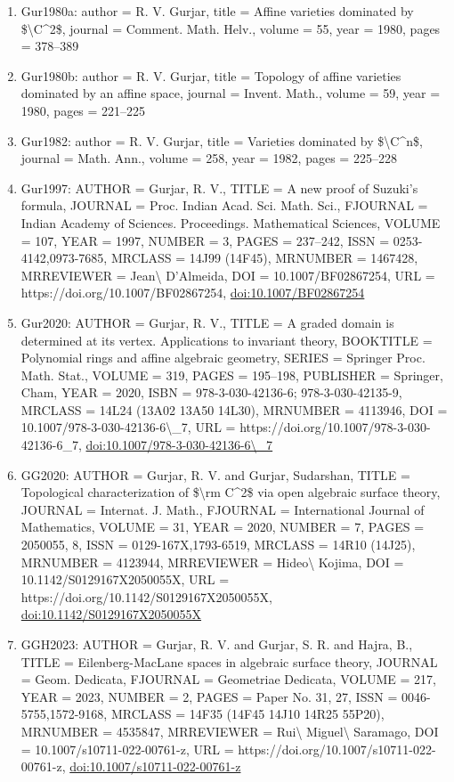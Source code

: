 \documentclass[11pt]{article}
\begin{document}
\begin{enumerate}[leftmargin=*]
  \item Gur1980a: author = R. V. Gurjar, title = Affine varieties dominated by \$\textbackslash{}C\^{}2\$, journal = Comment. Math. Helv., volume = 55, year = 1980, pages = 378--389
  \item Gur1980b: author = R. V. Gurjar, title = Topology of affine varieties dominated by an affine space, journal = Invent. Math., volume = 59, year = 1980, pages = 221--225
  \item Gur1982: author = R. V. Gurjar, title = Varieties dominated by \$\textbackslash{}C\^{}n\$, journal = Math. Ann., volume = 258, year = 1982, pages = 225--228
  \item Gur1997: AUTHOR = Gurjar, R. V., TITLE = A new proof of Suzuki's formula, JOURNAL = Proc. Indian Acad. Sci. Math. Sci., FJOURNAL = Indian Academy of Sciences. Proceedings. Mathematical Sciences, VOLUME = 107, YEAR = 1997, NUMBER = 3, PAGES = 237--242, ISSN = 0253-4142,0973-7685, MRCLASS = 14J99 (14F45), MRNUMBER = 1467428, MRREVIEWER = Jean\textbackslash{} D'Almeida, DOI = 10.1007/BF02867254, URL = https://doi.org/10.1007/BF02867254, \href{https://doi.org/10.1007/BF02867254}{doi:10.1007/BF02867254}
  \item Gur2020: AUTHOR = Gurjar, R. V., TITLE = A graded domain is determined at its vertex. Applications to invariant theory, BOOKTITLE = Polynomial rings and affine algebraic geometry, SERIES = Springer Proc. Math. Stat., VOLUME = 319, PAGES = 195--198, PUBLISHER = Springer, Cham, YEAR = 2020, ISBN = 978-3-030-42136-6; 978-3-030-42135-9, MRCLASS = 14L24 (13A02 13A50 14L30), MRNUMBER = 4113946, DOI = 10.1007/978-3-030-42136-6\textbackslash{}\_7, URL = https://doi.org/10.1007/978-3-030-42136-6\_7, \href{https://doi.org/10.1007/978-3-030-42136-6\textbackslash{}\_7}{doi:10.1007/978-3-030-42136-6\textbackslash{}\_7}
  \item GG2020: AUTHOR = Gurjar, R. V. and Gurjar, Sudarshan, TITLE = Topological characterization of \$\textbackslash{}rm C\^{}2\$ via open algebraic surface theory, JOURNAL = Internat. J. Math., FJOURNAL = International Journal of Mathematics, VOLUME = 31, YEAR = 2020, NUMBER = 7, PAGES = 2050055, 8, ISSN = 0129-167X,1793-6519, MRCLASS = 14R10 (14J25), MRNUMBER = 4123944, MRREVIEWER = Hideo\textbackslash{} Kojima, DOI = 10.1142/S0129167X2050055X, URL = https://doi.org/10.1142/S0129167X2050055X, \href{https://doi.org/10.1142/S0129167X2050055X}{doi:10.1142/S0129167X2050055X}
  \item GGH2023: AUTHOR = Gurjar, R. V. and Gurjar, S. R. and Hajra, B., TITLE = Eilenberg-MacLane spaces in algebraic surface theory, JOURNAL = Geom. Dedicata, FJOURNAL = Geometriae Dedicata, VOLUME = 217, YEAR = 2023, NUMBER = 2, PAGES = Paper No. 31, 27, ISSN = 0046-5755,1572-9168, MRCLASS = 14F35 (14F45 14J10 14R25 55P20), MRNUMBER = 4535847, MRREVIEWER = Rui\textbackslash{} Miguel\textbackslash{} Saramago, DOI = 10.1007/s10711-022-00761-z, URL = https://doi.org/10.1007/s10711-022-00761-z, \href{https://doi.org/10.1007/s10711-022-00761-z}{doi:10.1007/s10711-022-00761-z}

\end{enumerate}
\end{document}
